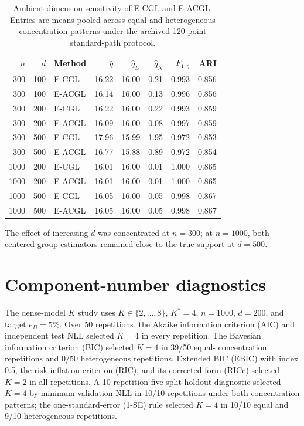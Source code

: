 \documentclass[preprint,12pt,authoryear]{elsarticle}
\begin{document}
\begin{table}[H]
\centering
\footnotesize
\setlength{\tabcolsep}{3pt}
\caption{Ambient-dimension sensitivity of E-CGL and E-ACGL. Entries are means
pooled across equal and heterogeneous concentration patterns under the
archived 120-point standard-path protocol.}
\label{tab:s-ambient-dimension}
\begin{tabular}{rrlrrrrr}
\toprule
$n$ & $d$ & Method & $\widehat q$ & $\widehat q_D$ & $\widehat q_N$ & $F_{1,\eta}$ & ARI \\
\midrule
300 & 100 & E-CGL & 16.22 & 16.00 & 0.21 & 0.993 & 0.856 \\
300 & 100 & E-ACGL & 16.14 & 16.00 & 0.13 & 0.996 & 0.856 \\
300 & 200 & E-CGL & 16.22 & 16.00 & 0.22 & 0.993 & 0.859 \\
300 & 200 & E-ACGL & 16.09 & 16.00 & 0.08 & 0.997 & 0.859 \\
300 & 500 & E-CGL & 17.96 & 15.99 & 1.95 & 0.972 & 0.853 \\
300 & 500 & E-ACGL & 16.77 & 15.88 & 0.89 & 0.972 & 0.854 \\
1000 & 200 & E-CGL & 16.01 & 16.00 & 0.01 & 1.000 & 0.865 \\
1000 & 200 & E-ACGL & 16.01 & 16.00 & 0.01 & 1.000 & 0.865 \\
1000 & 500 & E-CGL & 16.05 & 16.00 & 0.05 & 0.998 & 0.867 \\
1000 & 500 & E-ACGL & 16.05 & 16.00 & 0.05 & 0.998 & 0.867 \\
\bottomrule
\end{tabular}
\end{table}

The effect of increasing $d$ was concentrated at $n=300$; at $n=1000$, both
centered group estimators remained close to the true support at $d=500$.

\section{Component-number diagnostics}
\label{sec:s-component-number}

The dense-model $K$ study uses $K\in\{2,\ldots,8\}$, $K^\ast=4$, $n=1000$,
$d=200$, and target $e_B=5\%$. Over 50 repetitions, the Akaike information
criterion (AIC) and independent test NLL selected $K=4$ in every repetition.
The Bayesian information criterion (BIC) selected $K=4$ in 39/50 equal-
concentration repetitions and 0/50 heterogeneous repetitions. Extended BIC
(EBIC) with index 0.5, the risk inflation criterion (RIC), and its corrected
form (RICc) selected $K=2$ in all repetitions. A 10-repetition five-split
holdout diagnostic selected $K=4$ by minimum validation NLL in 10/10
repetitions under both concentration patterns; the one-standard-error (1-SE)
rule selected $K=4$
in 10/10 equal and 9/10 heterogeneous repetitions.
\end{document}
